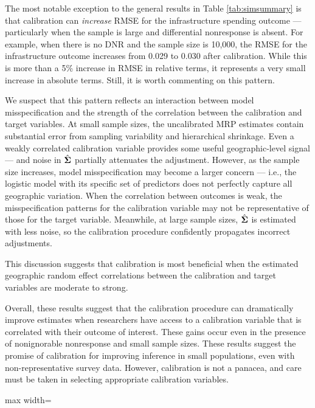 The most notable exception to the general results in Table \ref{tab:simsummary} is that calibration can \textit{increase} RMSE for the infrastructure spending outcome --- particularly when the sample is large and differential nonresponse is absent. 
For example, when there is no DNR and the sample size is 10,000, the RMSE for the infrastructure outcome increases from 0.029 to 0.030 after calibration.
While this is more than a 5\% increase in  RMSE in relative terms, it represents a very small increase in absolute terms. 
Still, it is worth commenting on this pattern. 

We suspect that this pattern reflects an interaction between model misspecification and the strength of the correlation between the calibration and target variables.
At small sample sizes, the uncalibrated MRP estimates contain substantial error from sampling variability and hierarchical shrinkage. 
Even a weakly correlated calibration variable provides some useful geographic-level signal --- and noise in $\hat{\mathbf{\Sigma}}$ partially attenuates the adjustment. 
However, as the sample size increases, model misspecification may become a larger concern --- i.e., the logistic model with its specific set of predictors does not perfectly capture all geographic variation.
When the correlation between outcomes is weak, the misspecification patterns for the calibration variable may not be representative of those for the target variable. 
Meanwhile, at large sample sizes, $\hat{\mathbf{\Sigma}}$ is estimated with less noise, so the calibration procedure confidently propagates incorrect adjustments.

This discussion suggests that calibration is most beneficial when the estimated geographic random effect correlations between the calibration and target variables are moderate to strong.

Overall, these results suggest that the calibration procedure can dramatically improve estimates when researchers have access to a calibration variable that is correlated with their outcome of interest. 
These gains occur even in the presence of nonignorable nonresponse and small sample sizes. 
These results suggest the promise of calibration for improving inference in small populations, even with non-representative survey data. 
However, calibration is not a panacea, and care must be taken in selecting appropriate calibration variables.


\begin{table}[h]
      \caption{Summary of Simulation Results}
      \label{tab:simsummary}
    \begin{adjustbox}{max width=\textwidth}
      
    \end{adjustbox}
\end{table}




